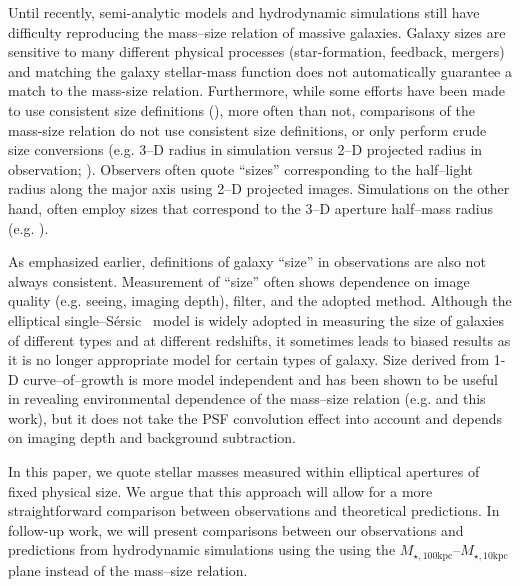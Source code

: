 \documentclass[a4paper,fleqn,usenatbib]{mnras}
\def\ser{{S\'{e}rsic\ }}
\def\minn{{$M_{\star,10\mathrm{kpc}}$}}
\def\mtot{{$M_{\star,100\mathrm{kpc}}$}}
\begin{document}
    Until recently, semi-analytic models and hydrodynamic simulations still have 
    difficulty reproducing the mass--size relation of massive galaxies. 
    Galaxy sizes are sensitive to many different physical processes (star-formation, 
    feedback, mergers) and matching the galaxy stellar-mass function does not 
    automatically guarantee a match to the mass-size relation. 
    Furthermore, while some efforts have been made to use consistent size definitions 
    (\citealt{McCarthy2017}), more often than not, comparisons of the mass-size relation 
    do not use consistent size definitions, or only perform crude size conversions 
    (e.g. 3--D radius in simulation versus 2--D projected radius in observation; 
    \citealt{Genel2017}). 
    Observers often quote ``sizes'' corresponding to the half--light radius along the 
    major axis using 2--D projected images. 
    Simulations on the other hand, often employ sizes that correspond to the 3--D 
    aperture half--mass radius (e.g. \citealt{Price2017}). 
    
    As emphasized earlier, definitions of galaxy ``size'' in observations are also not 
    always consistent. 
    Measurement of ``size'' often shows dependence on image quality (e.g. seeing, 
    imaging depth), filter, and the adopted method. 
    Although the elliptical single--\ser{} model is widely adopted in measuring the 
    size of galaxies of different types and at different redshifts, it sometimes leads
    to biased results as it is no longer appropriate model for certain types of galaxy. 
    Size derived from 1-D curve--of--growth is more model independent and has been 
    shown to be useful in revealing environmental dependence of the mass--size relation 
    (e.g. \citealt{Yoon2017} and this work), but it does not take the PSF convolution 
    effect into account and depends on imaging depth and background subtraction.

    In this paper, we quote stellar masses measured within elliptical apertures of 
    fixed physical size. 
    We argue that this approach will allow for a more straightforward comparison 
    between observations and theoretical predictions. 
    In follow-up work, we will present comparisons between our observations and 
    predictions from hydrodynamic simulations using the using the \mtot{}--\minn{} 
    plane instead of the mass--size relation. 
          
\end{document}
